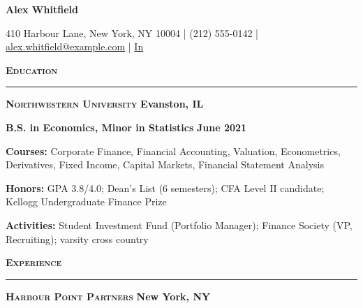 \documentclass{article}
\newcommand{\vs}{\vspace{0.3cm}}
\begin{document}
\begin{center}
	\textbf{\LARGE Alex Whitfield}

	410 Harbour Lane, New York, NY 10004 | (212) 555-0142 | \href{mailto:alex.whitfield@example.com}{alex.whitfield@example.com} | \href{https://www.linkedin.com/in/alexwhitfield/}{In}
\end{center}

\noindent \textbf{\textsc{\large Education}}

\noindent \rule[3pt]{\textwidth}{1pt}

\noindent \textbf{\textsc{Northwestern University}} \hfill \textbf{Evanston, IL}

\noindent \textbf{B.S. in Economics, Minor in Statistics} \hfill \textbf{June 2021}

\noindent \textbf{Courses:} Corporate Finance, Financial Accounting, Valuation, Econometrics, Derivatives, Fixed Income, Capital Markets, Financial Statement Analysis

\noindent \textbf{Honors:} GPA 3.8/4.0; Dean's List (6 semesters); CFA Level II candidate; Kellogg Undergraduate Finance Prize

\noindent \textbf{Activities:} Student Investment Fund (Portfolio Manager); Finance Society (VP, Recruiting); varsity cross country
\vs

\noindent \textbf{\textsc{\large Experience}}

\noindent \rule[3pt]{\textwidth}{1pt}

\noindent \textbf{\textsc{Harbour Point Partners}} \hfill \textbf{New York, NY}
\end{document}
